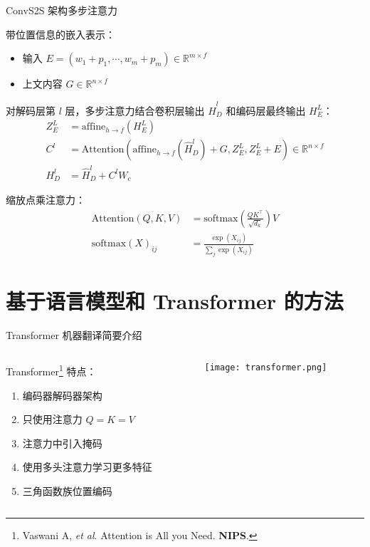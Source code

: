 \begin{frame}[c]{ConvS2S 架构}{多步注意力}
{\footnotesize
	带位置信息的嵌入表示：
	\begin{itemize}
		\item 输入 $E = (w_1 + p_1, \cdots, w_m + p_m) \in \mathbb{R}^{m \times f}$
		\item 上文内容 $G \in \mathbb{R}^{n \times f}$
	\end{itemize}

	对解码层第 $l$ 层，多步注意力结合卷积层输出 $\hat{H}_D^l$ 和编码层最终输出 $H^L_E$：
	\begin{align}
		Z_E^L &= \text{affine}_{h \rightarrow f}(H_E^L) \\
		C^l &= \text{Attention}(\text{affine}_{h \rightarrow f}(\hat{H}_D^l) + G, Z_E^L, Z_E^L + E) \in \mathbb{R}^{n \times f}\\
		H_D^l &= \hat{H}^l_D + C^l W_c
	\end{align}
	
	缩放点乘注意力：
	\begin{align}
		\text{Attention} (Q, K, V) &= \text{softmax}(\frac{QK^\top}{\sqrt{d_k}}) V \\
		\text{softmax}(X)_{ij} &= \frac{\exp(X_{ij})}{\sum_j \exp(X_{ij})}
	\end{align}
}%
\end{frame}

\section{基于语言模型和 Transformer 的方法}

\begin{frame}[c]{Transformer 机器翻译}{简要介绍}
	\begin{columns}[t]
		\begin{column}[T]{5cm}
			Transformer\footnote{Vaswani A, \textit{et al}. Attention is All you Need. \textbf{NIPS}.} 特点：
			\begin{enumerate}
				\item 编码器解码器架构
				\item 只使用注意力 $Q = K = V$
				\item 注意力中引入掩码
				\item 使用多头注意力学习更多特征
				\item 三角函数族位置编码
			\end{enumerate}
		\end{column}
		\begin{column}[T]{5cm}
			\vspace{-2.5em}
			\texttt{[image: transformer.png]}
		\end{column}
	\end{columns}
\end{frame}


